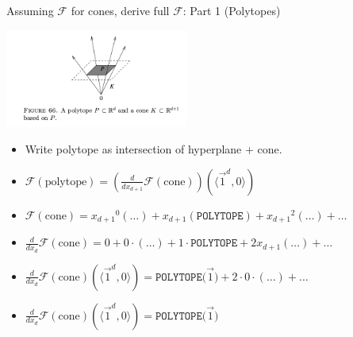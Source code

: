 \documentclass[8pt]{beamer}
\begin{document}
\begin{frame}[label=sec-7]{Assuming $\mathcal{F}$ for cones, derive full $\mathcal{F}$: Part 1 (Polytopes)}
\begin{center}
 \includegraphics[width=6cm, keepaspectratio]{res/polytope-as-cross-section-of-cone}
\end{center}
\begin{itemize}
\item Write polytope as intersection of hyperplane + cone.
\item $\mathcal{F}(\text{polytope}) = (\frac{d}{dx_{d+1}} \mathcal{F}(\text{cone}))(\langle \vec 1^{d}, 0 \rangle)$
\item $\mathcal{F}(\text{cone}) = {x_{d+1}}^0 (\ldots) +  {x_{d+1}} (\texttt{POLYTOPE}) +  {x_{d+1}}^2(\ldots) + \ldots$
\item $\frac{d}{dx_d} \mathcal{F}(\text{cone}) = 0 + 0 \cdot  (\ldots) + 1 \cdot \texttt{POLYTOPE} +    2 x_{d+1} (\ldots) + \ldots$
\item $\frac{d}{dx_d} \mathcal{F}(\text{cone})(\langle \vec 1^{d}, 0 \rangle) = \texttt{POLYTOPE(\(\vec 1 \))} +  2 \cdot 0 \cdot (\ldots) + \ldots$
\item $\frac{d}{dx_d} \mathcal{F}(\text{cone})(\langle \vec 1^{d}, 0 \rangle) = \texttt{POLYTOPE(\(\vec 1 \))}$
\end{itemize}
\end{frame}
\end{document}
